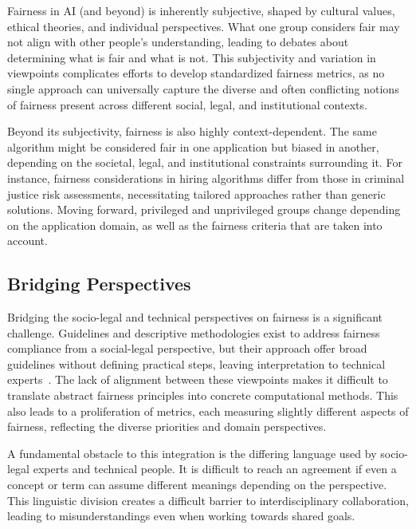 \documentclass[12pt,a4paper,openright,twoside]{book}
\begin{document}

Fairness in \ac{AI} (and beyond) is inherently subjective, shaped by cultural values, ethical theories, and individual perspectives.
%
What one group considers fair may not align with other people’s understanding, leading to debates about determining what is fair and what is not.
%
This subjectivity and variation in viewpoints complicates efforts to develop standardized fairness metrics, as no single approach can universally capture the diverse and often conflicting notions of fairness present across different social, legal, and institutional contexts.


Beyond its subjectivity, fairness is also highly context-dependent. The same algorithm might be considered fair in one application but biased in another, depending on the societal, legal, and institutional constraints surrounding it.
%
For instance, fairness considerations in hiring algorithms differ from those in criminal justice risk assessments, necessitating tailored approaches rather than generic solutions.
%
Moving forward, privileged and unprivileged groups change depending on the application domain, as well as the fairness criteria that are taken into account.

\subsection{Bridging Perspectives}

Bridging the socio-legal and technical perspectives on fairness is a significant challenge. 
%
Guidelines and descriptive methodologies exist to address fairness compliance from a social-legal perspective, but their approach offer broad guidelines without defining practical steps, leaving interpretation to technical experts~\cite{hicssfairness2025}.
%
The lack of alignment between these viewpoints makes it difficult to translate abstract fairness principles into concrete computational methods.
%
This also leads to a proliferation of metrics, each measuring slightly different aspects of fairness, reflecting the diverse priorities and domain perspectives.


A fundamental obstacle to this integration is the differing language used by socio-legal experts and technical people.
%
It is difficult to reach an agreement if even a concept or term can assume different meanings depending on the perspective.
This linguistic division creates a difficult barrier to interdisciplinary collaboration, leading to misunderstandings even when working towards shared goals.
\end{document}
